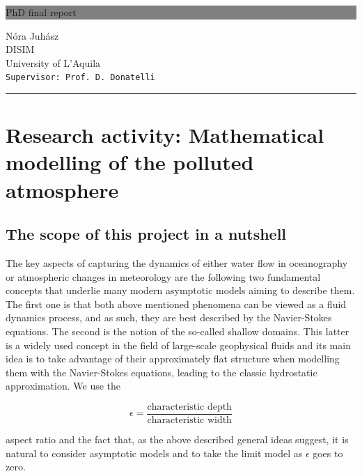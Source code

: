 \documentclass[11pt]{article}
\begin{document}
\begin{titlepage}
	\colorbox{grey}{
		\parbox[t]{0.93\textwidth}{
			\parbox[t]{0.91\textwidth}{
				\raggedleft
				\fontsize{50pt}{80pt}\selectfont
				\vspace{0.7cm}
				{\selectfont PhD final report} \\
				\vspace{0.7cm}
			}
		}
	}
	\vfill
	\parbox[t]{0.93\textwidth}{
		\raggedleft
		\large
		{\Large N\'{o}ra Juh\'{a}sz}\\[4pt]
		DISIM\\
		University of L'Aquila\\[4pt]
		\texttt{\Large Supervisor: Prof. D. Donatelli}\\
		
		\hfill\rule{0.2\linewidth}{1pt}
	}
\end{titlepage}

\newpage
\tableofcontents

\newpage

\section{Research activity: Mathematical modelling of the polluted atmosphere}

\subsection{The scope of this project in a nutshell}

The key aspects of capturing the dynamics of either water flow in oceanography or atmospheric changes in meteorology are the following two fundamental concepts that underlie many modern asymptotic models aiming to describe them. The first one is that both above mentioned phenomena can be viewed as a fluid dynamics process, and as such, they are best described by the Navier-Stokes equations. The second is the notion of the so-called shallow domains. This latter is a widely used concept in the field of large-scale geophysical fluids and its main idea is to take advantage of their approximately flat structure when modelling them with the Navier-Stokes equations, leading to the classic hydrostatic approximation. We use the

\[ \epsilon = \frac{\text{characteristic depth}}{\text{characteristic width}} \]

aspect ratio and the fact that, as the above described general ideas suggest, it is natural to consider asymptotic models and to take the limit model as $\epsilon$ goes to zero.
\end{document}
